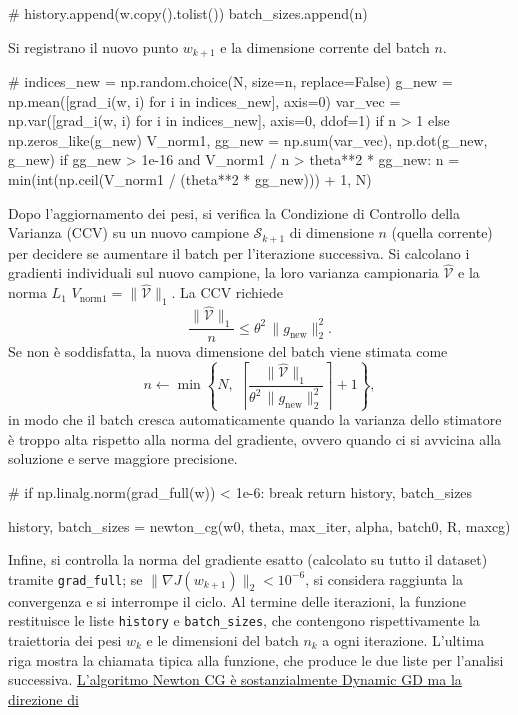 \documentclass[italian, a4paper, twoside, binding=6mm]{sapthesis}
\begin{document}
\begin{pythoncode}[title= Newton-CG]

#
        history.append(w.copy().tolist())
        batch_sizes.append(n)
\end{pythoncode}
Si registrano il nuovo punto \(w_{k+1}\) e la dimensione corrente del batch \(n\).
\begin{pythoncode}[title= Newton-CG]

#
        indices_new = np.random.choice(N, size=n, replace=False)
        g_new = np.mean([grad_i(w, i) for i in indices_new], axis=0)
        var_vec = np.var([grad_i(w, i) for i in indices_new], axis=0, ddof=1) if n > 1 else np.zeros_like(g_new)
        V_norm1, gg_new = np.sum(var_vec), np.dot(g_new, g_new)
        if gg_new > 1e-16 and V_norm1 / n > theta**2 * gg_new:
            n = min(int(np.ceil(V_norm1 / (theta**2 * gg_new))) + 1, N)
\end{pythoncode}
Dopo l'aggiornamento dei pesi, si verifica la Condizione di Controllo della Varianza (CCV) su un nuovo campione \(\mathcal{S}_{k+1}\) di dimensione \(n\) (quella corrente) per decidere se aumentare il batch per l'iterazione successiva. Si calcolano i gradienti individuali sul nuovo campione, la loro varianza campionaria \(\widehat{\mathcal{V}}\) e la norma \(L_1\) \(V_{\text{norm1}} = \|\widehat{\mathcal{V}}\|_1\). La CCV richiede
\[
\frac{\|\widehat{\mathcal{V}}\|_1}{n} \le \theta^2 \,\|g_{\text{new}}\|_2^2.
\]
Se non è soddisfatta, la nuova dimensione del batch viene stimata come
\[
n \leftarrow \min\left\{N,\; \left\lceil \frac{\|\widehat{\mathcal{V}}\|_1}{\theta^2\,\|g_{\text{new}}\|_2^2} \right\rceil + 1 \right\},
\]
in modo che il batch cresca automaticamente quando la varianza dello stimatore è troppo alta rispetto alla norma del gradiente, ovvero quando ci si avvicina alla soluzione e serve maggiore precisione.

\begin{pythoncode}[title= Newton-CG]

#
        if np.linalg.norm(grad_full(w)) < 1e-6:
            break
    return history, batch_sizes

history, batch_sizes = newton_cg(w0, theta, max_iter, alpha, batch0, R, maxcg)
\end{pythoncode}
Infine, si controlla la norma del gradiente esatto (calcolato su tutto il dataset) tramite \texttt{grad\_full}; se \(\|\nabla J(w_{k+1})\|_2 < 10^{-6}\), si considera raggiunta la convergenza e si interrompe il ciclo. Al termine delle iterazioni, la funzione restituisce le liste \texttt{history} e \texttt{batch\_sizes}, che contengono rispettivamente la traiettoria dei pesi \(w_k\) e le dimensioni del batch \(n_k\) a ogni iterazione. L'ultima riga mostra la chiamata tipica alla funzione, che produce le due liste per l'analisi successiva.
\underline{L'algoritmo Newton CG è sostanzialmente Dynamic GD ma la direzione di}
\end{document}
